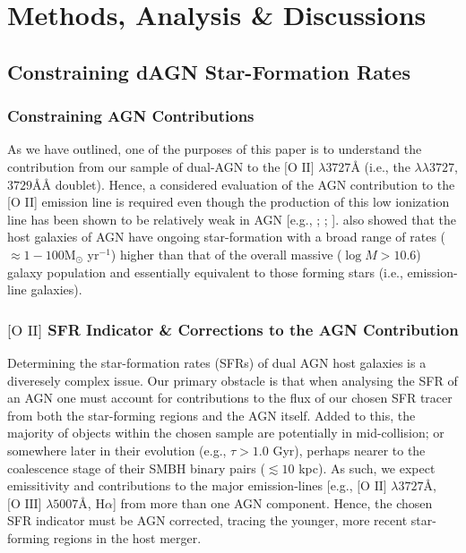 \section{Methods, Analysis \& Discussions}
\subsection{Constraining dAGN Star-Formation Rates}
\subsubsection{Constraining AGN Contributions}

As we have outlined, one of the purposes of this paper is to understand the contribution from our sample of dual-AGN to the $\text{[O II]}$ $\lambda{3727}Å$ (i.e., the $\lambda\lambda{3727}$,$3729ÅÅ$ doublet). Hence, a considered evaluation of the AGN contribution to the [O II] emission line is required even though the production of this low ionization line has been shown to be relatively weak in AGN [e.g., \cite{Ferland_1986}; \cite{Ho_1993}; \cite{2006ApJ...642..702K}]. \cite{2009ApJ...696..396S} also showed that the host galaxies of AGN have ongoing star-formation with a broad range of rates ($\approx{1-100}$M$_{\odot}$ yr$^{-1}$) higher than that of the overall massive ($\log{M}>{10.6}$) galaxy population and essentially equivalent to those forming stars (i.e., emission-line galaxies).

\subsubsection{${\text{[O II]}}$ SFR Indicator \& Corrections to the AGN Contribution}

Determining the star-formation rates (SFRs) of dual AGN host galaxies is a diveresely complex issue. Our primary obstacle is that when analysing the SFR of an AGN one must account for contributions to the flux of our chosen SFR tracer from both the star-forming regions and the AGN itself. Added to this, the majority of objects within the chosen sample are potentially in mid-collision; or somewhere later in their evolution (e.g., ${\tau}>{1.0}$ Gyr), perhaps nearer to the coalescence stage of their SMBH binary pairs ($\lesssim{10}$ kpc). As such, we expect emissitivity and contributions to the major emission-lines [e.g., $\text{[O II]}$ $\lambda{3727}Å$, $\text{[O III]}$ $\lambda{5007}Å$, $\text{H}\alpha$] from more than one AGN component. Hence, the chosen SFR indicator must be AGN corrected, tracing the younger, more recent star-forming regions in the host merger. 


